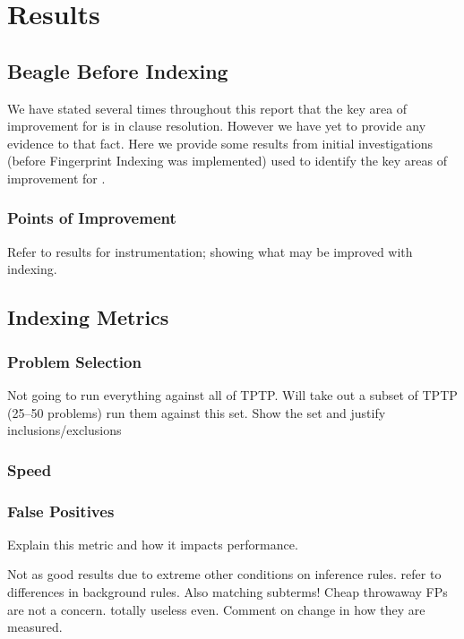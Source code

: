 
\chapter{Results}
\label{cha:results}

\section{Beagle Before Indexing}
\label{sec:preindexing}

We have stated several times throughout this report that the key area of improvement for \beagle
is in clause resolution. However we have yet to provide any evidence to that fact.
Here we provide some results from initial investigations (before Fingerprint Indexing
was implemented) used to identify the key areas of improvement for \beagle.

\subsection{Points of Improvement}
\label{section:instr}

Refer to results for instrumentation; showing what may be improved with indexing.

\section{Indexing Metrics}
\label{sec:metrics}

\subsection{Problem Selection}
Not going to run everything against all of TPTP. Will take out a subset
of TPTP (25--50 problems) run them against this set.
Show the set and justify inclusions/exclusions

\subsection{Speed}

\subsection{False Positives}
Explain this metric and how it impacts performance.

Not as good results due to extreme other conditions on inference rules.
refer to differences in background rules. Also matching subterms!
Cheap throwaway FPs are not a concern.
totally useless even. Comment on change in how they are measured.

